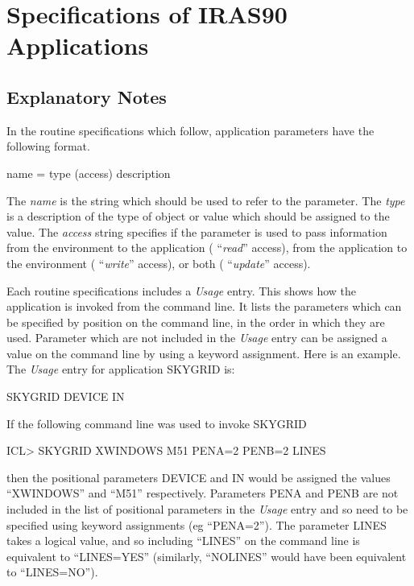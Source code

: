 \documentclass[11pt,nolof,noabs]{starlink}
\begin{document}
\section{Specifications of IRAS90 Applications}
\label{ap:full}
\subsection{Explanatory Notes}

In the routine specifications which follow, application parameters have the
following format.

\begin{terminalv}
name  =  type (access)
  description
\end{terminalv}

The \emph{name} is the string which should be used to refer to the parameter. The
\emph{type} is a description of the type of object or value which should be
assigned to the value. The \emph{access} string specifies if the parameter is
used to pass information from the environment to the application ( ``\emph{read}'' access), from the application to the environment ( ``\emph{write}''
access), or both ( ``\emph{update}'' access).

Each routine specifications includes a \emph{Usage\/} entry.  This shows how the
application is invoked from the command line.   It lists the parameters which
can be specified by position on the command line, in the order in which they
are used. Parameter which are not included in the \emph{Usage\/} entry can be
assigned a value on the command line by using a keyword assignment. Here is an
example. The \emph{Usage\/} entry for application SKYGRID is:

\begin{terminalv}
SKYGRID DEVICE IN
\end{terminalv}

If the following command line was used to invoke SKYGRID

\small
\begin{terminalv}
ICL> SKYGRID XWINDOWS M51 PENA=2 PENB=2 LINES
\end{terminalv}
\normalsize

then the positional parameters DEVICE and IN would be assigned the values
``XWINDOWS'' and ``M51'' respectively. Parameters PENA and PENB are not included
in the list of positional parameters in the \emph{Usage\/} entry and so need to
be specified using keyword assignments (eg ``PENA=2''). The parameter LINES
takes a logical value, and so including ``LINES'' on the command line is
equivalent to ``LINES=YES'' (similarly, ``NOLINES'' would have been equivalent
to ``LINES=NO'').
\end{document}
